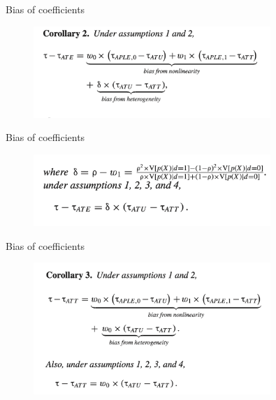 \documentclass{beamer}
\begin{document}
\begin{frame}{Bias of coefficients}
    \begin{figure}
        \centering
        \includegraphics[width=0.8\textwidth]{./lecture_includes/ols_bias1.png}
    \end{figure}
\end{frame}


\begin{frame}{Bias of coefficients}
    \begin{figure}
        \centering
        \includegraphics[width=0.8\textwidth]{./lecture_includes/ols_bias2.png}
    \end{figure}
\end{frame}

\begin{frame}{Bias of coefficients}
    \begin{figure}
        \centering
        \includegraphics[width=0.8\textwidth]{./lecture_includes/ols_bias3.png}
    \end{figure}
\end{frame}
\end{document}
